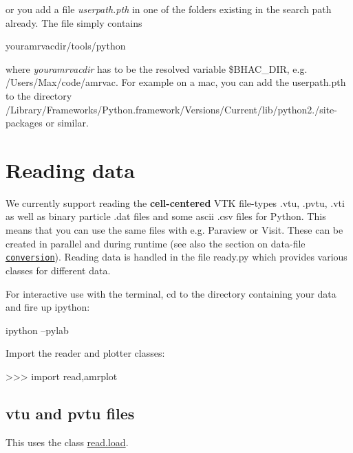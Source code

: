 or you add a file {\itshape userpath.\+pth} in one of the folders existing in the search path already. The file simply contains


\begin{DoxyCode}
youramrvacdir/tools/python
\end{DoxyCode}


where {\itshape youramrvacdir} has to be the resolved variable {\ttfamily \$\+B\+H\+A\+C\+\_\+\+D\+IR}, e.\+g. {\ttfamily /\+Users/\+Max/code/amrvac}. For example on a mac, you can add the userpath.\+pth to the directory {\ttfamily /\+Library/\+Frameworks/\+Python.framework/\+Versions/\+Current/lib/python2./site-\/packages} or similar.\hypertarget{index_reading}{}\section{Reading data}\label{index_reading}
We currently support reading the {\bfseries cell-\/centered} V\+TK file-\/types {\ttfamily .vtu, .pvtu, .vti} as well as binary particle {\ttfamily .dat} files and some ascii {\ttfamily .csv} files for Python. This means that you can use the same files with e.\+g. Paraview or Visit. These can be created in parallel and during runtime (see also the section on data-\/file \href{../convert.html}{\tt conversion}). Reading data is handled in the file ready.\+py which provides various classes for different data.

For interactive use with the terminal, cd to the directory containing your data and fire up ipython\+: 
\begin{DoxyCode}
ipython --pylab
\end{DoxyCode}
 Import the reader and plotter classes\+: 
\begin{DoxyCode}
>>> import read,amrplot
\end{DoxyCode}
 \hypertarget{index_vtu}{}\subsection{vtu and pvtu files}\label{index_vtu}
This uses the class \hyperlink{classread_1_1load}{read.\+load}.

